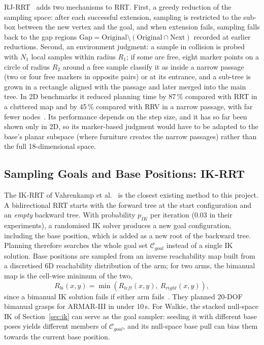 \documentclass[12pt,a4paper]{article}
\begin{document}
RJ-RRT~\cite{chai2022} adds two mechanisms to RRT. First, a greedy reduction of the sampling space:
after each successful extension, sampling is restricted to the sub-box between the new vertex and the
goal, and when extension fails, sampling falls back to the gap regions
$\mathrm{Gap}=\mathrm{Original}\setminus(\mathrm{Original}\cap\mathrm{Next})$ recorded at earlier
reductions. Second, an environment judgment: a sample in collision is probed with $N_1$ local samples
within radius $R_1$; if some are free, eight marker points on a circle of radius $R_2$ around a free
sample classify it as inside a narrow passage (two or four free markers in opposite pairs) or at its
entrance, and a sub-tree is grown in a rectangle aligned with the passage and later merged into the main
tree. In 2D benchmarks it reduced planning time by 87\,\% compared with RRT in a cluttered map and by
45\,\% compared with RRV in a narrow passage, with far fewer nodes~\cite{chai2022}. Its performance
depends on the step size, and it has so far been shown only in 2D, so its marker-based judgment would
have to be adapted to the base's planar subspace (where furniture creates the narrow passages) rather
than the full 18-dimensional space.

\subsection{Sampling Goals and Base Positions: IK-RRT}

The IK-RRT of Vahrenkamp et al.~\cite{vahrenkamp2010} is the closest existing method to this project.
A bidirectional RRT starts with the forward tree at the start configuration and an \emph{empty}
backward tree. With probability $p_{IK}$ per iteration (0.03 in their experiments), a randomised IK
solver produces a new goal configuration, including the base position, which is added as a new root
of the backward tree. Planning therefore searches the whole goal set $\mathcal{C}_{goal}$ instead of a
single IK solution. Base positions are sampled from an inverse reachability map built from a
discretised 6D reachability distribution of the arm; for two arms, the bimanual map is the cell-wise
minimum of the two,
\begin{equation}
    R_{bi}(x,y)=\min\!\left(R_{left}(x,y),\ R_{right}(x,y)\right),
\end{equation}
since a bimanual IK solution fails if either arm fails~\cite{vahrenkamp2010}. They planned 20-DOF
bimanual grasps for ARMAR-III in under 10\,s. For Walkie, the stacked null-space IK of
Section~\ref{sec:ik} can serve as the goal sampler: seeding it with different base poses yields
different members of $\mathcal{C}_{goal}$, and its null-space base pull can bias them towards the
current base position.
\end{document}
